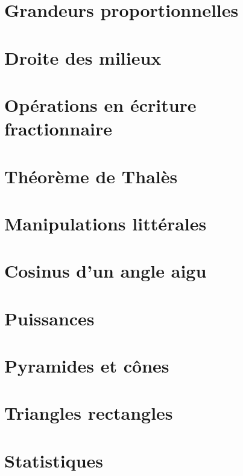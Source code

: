 \documentclass[a4paper,10pt]{book}
\begin{document}
\chapter{Grandeurs proportionnelles}


\chapter{Droite des milieux}


\chapter{Opérations en écriture fractionnaire}


\chapter{Théorème de Thalès}


\chapter{Manipulations littérales}


\chapter{Cosinus d'un angle aigu}


\chapter{Puissances}


\chapter{Pyramides et cônes}


\chapter{Triangles rectangles}


\chapter{Statistiques}

\end{document}

